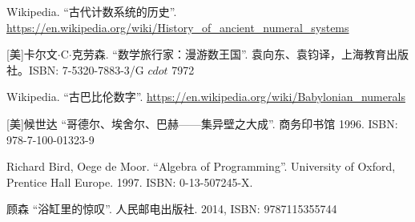 \documentclass[UTF8]{article}
\begin{document}
\begin{Exercise}
\end{Exercise}

\ifx\wholebook\relax \else
\begin{thebibliography}{99}

Wikipedia. ``古代计数系统的历史''. \url{https://en.wikipedia.org/wiki/History_of_ancient_numeral_systems}

[美]卡尔文$\cdot$C$\cdot$克劳森. ``数学旅行家：漫游数王国''. 袁向东、袁钧译，上海教育出版社。ISBN: 7-5320-7883-3/G $cdot$ 7972

Wikipedia. ``古巴比伦数字''. \url{https://en.wikipedia.org/wiki/Babylonian_numerals}

[美]候世达 ``哥德尔、埃舍尔、巴赫——集异壁之大成''. 商务印书馆 1996. ISBN: 978-7-100-01323-9

Richard Bird, Oege de Moor. ``Algebra of Programming''. University of Oxford, Prentice Hall Europe. 1997. ISBN: 0-13-507245-X.

顾森 ``浴缸里的惊叹''. 人民邮电出版社. 2014, ISBN: 9787115355744

\end{thebibliography}

\expandafter\enddocument

\fi
\end{document}
